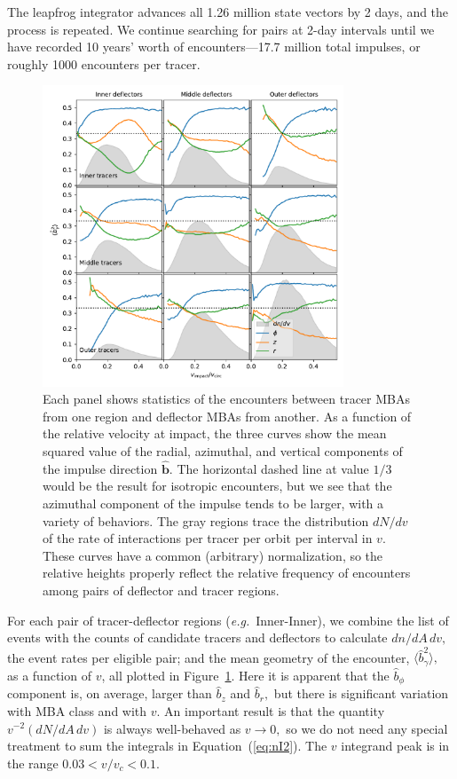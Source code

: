 \documentclass[linenumbers, onecolumn]{aastex631}
\newcommand{\eqq}[1]{Equation~(\ref{#1})}
\newcommand{\eg}{\textit{e.g.\/}}
\newcommand{\bhat}{\mathbf{\hat b}}
\begin{document}
The leapfrog integrator advances all 1.26 million state vectors by 2
days, and the process is repeated.  We continue searching for pairs at
2-day intervals until we have recorded 10 years' worth of encounters---17.7 million
total impulses, or roughly 1000 encounters per tracer.

\begin{figure}
  \centering
  \includegraphics[width=0.8\textwidth]{isq.pdf}
  \caption{Each panel shows statistics of the encounters between
    tracer MBAs from one region and deflector MBAs from another.  As a
    function of the relative velocity at impact, the three curves show
    the mean squared value of the radial, azimuthal, and vertical
    components of the impulse direction $\bhat.$  The horizontal
    dashed line at value $1/3$ would be the result for isotropic
    encounters, but we see that the azimuthal component of the impulse
    tends to be larger, with a variety of behaviors.  The gray regions
    trace the distribution $dN/dv$ of the rate of interactions per
    tracer per orbit per interval in $v.$  These curves have a common
    (arbitrary) normalization, so the relative heights properly
    reflect the relative frequency of encounters among
    pairs of deflector and tracer regions.}
  \label{fig:rtz}
\end{figure}

For each pair of tracer-deflector regions (\eg\ Inner-Inner), we combine the list of
events with the counts of candidate tracers and deflectors to
calculate $dn/dA\,dv,$ the event rates per eligible pair; and the mean
geometry of the encounter, $\langle \hat b^2_\gamma \rangle,$ as a
function of $v$, all plotted in Figure~\ref{fig:rtz}.
Here it is apparent that the $\hat b_\phi$ component is, on average,
larger than $\hat b_z$ and $\hat b_r,$ but there is significant
variation with MBA class and with $v$.  An important result is that
the quantity $v^{-2} (dN/dA\,dv)$ is always well-behaved as $v\rightarrow 0,$
so we do not need any special treatment to sum the integrals in
\eqq{eq:nI2}.  The $v$ integrand peak is in the range $0.03<v/v_c<0.1.$
\end{document}
